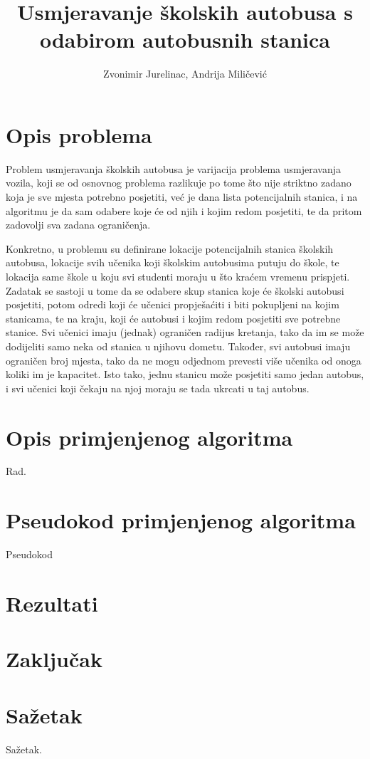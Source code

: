 \documentclass[times, utf8, seminar, numeric]{fer}
\begin{document}
\nocite{*}

\title{Usmjeravanje školskih autobusa s odabirom autobusnih stanica}

\author{Zvonimir Jurelinac, Andrija Miličević}


\maketitle

\tableofcontents

\chapter{Opis problema}
Problem usmjeravanja školskih autobusa je varijacija problema usmjeravanja vozila, koji se od osnovnog problema razlikuje po tome što nije striktno zadano koja je sve mjesta potrebno posjetiti, već je dana lista potencijalnih stanica, i na algoritmu je da sam odabere koje će od njih i kojim redom posjetiti, te da pritom zadovolji sva zadana ograničenja.

Konkretno, u problemu su definirane lokacije potencijalnih stanica školskih autobusa, lokacije svih učenika koji školskim autobusima putuju do škole, te lokacija same škole u koju svi studenti moraju u što kraćem vremenu prispjeti. Zadatak se sastoji u tome da se odabere skup stanica koje će školski autobusi posjetiti, potom odredi koji će učenici propješaćiti i biti pokupljeni na kojim stanicama, te na kraju, koji će autobusi i kojim redom posjetiti sve potrebne stanice. Svi učenici imaju (jednak) ograničen radijus kretanja, tako da im se može dodijeliti samo neka od stanica u njihovu dometu. Također, svi autobusi imaju ograničen broj mjesta, tako da ne mogu odjednom prevesti više učenika od onoga koliki im je kapacitet. Isto tako, jednu stanicu može posjetiti samo jedan autobus, i svi učenici koji čekaju na njoj moraju se tada ukrcati u taj autobus.

\chapter{Opis primjenjenog algoritma}
Rad.

\chapter{Pseudokod primjenjenog algoritma}
Pseudokod

\chapter{Rezultati}

\chapter{Zaključak}

%
%

\chapter{Sažetak}
Sažetak.
\end{document}
